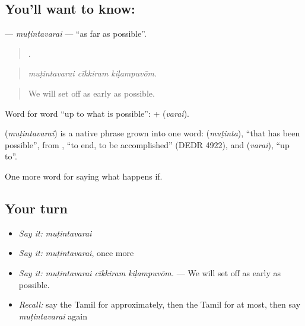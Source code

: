 \subsection*{You'll want to know: }
\textbf{} — \emph{muṭintavarai} — \textquotedblleft{}as far as possible\textquotedblright{}.

\begin{quote}
  .
\end{quote}

\begin{quote}
\emph{muṭintavarai cīkkiram kiḷampuvōm.}
\end{quote}

\begin{quote}
We will set off as early as possible.
\end{quote}

Word for word \textquotedblleft{}up to what is possible\textquotedblright{}:  +  (\emph{varai}).

\begin{cousinweb}
\textbf{} (\emph{muṭintavarai}) is a native phrase grown into one word:  (\emph{muṭinta}), \textquotedblleft{}that has been possible\textquotedblright{}, from , \textquotedblleft{}to end, to be accomplished\textquotedblright{} (DEDR 4922), and  (\emph{varai}), \textquotedblleft{}up to\textquotedblright{}.
\end{cousinweb}

\begin{grammarlens}[title={What you've built}]
One more word for saying what happens if.
\end{grammarlens}

\subsection*{Your turn}
\begin{itemize}
\raggedright
  \item \emph{Say it:} \emph{muṭintavarai}
  \item \emph{Say it:} \emph{muṭintavarai}, once more
  \item \emph{Say it:} \emph{muṭintavarai cīkkiram kiḷampuvōm.} — We will set off as early as possible.
  \item \emph{Recall:} say the Tamil for approximately, then the Tamil for at most, then say \emph{muṭintavarai} again
\end{itemize}

